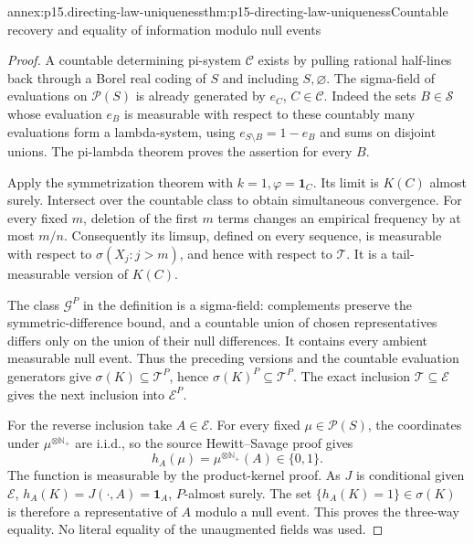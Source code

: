 \begin{annexitem}{annex:p15.directing-law-uniqueness}{thm:p15-directing-law-uniqueness}{Countable recovery and equality of information modulo null events}
\begin{proof}
A countable determining pi-system \(\mathcal C\) exists by pulling
rational half-lines back through a Borel real coding of \(S\) and
including \(S,\varnothing\).
The sigma-field of evaluations on \(\mathscr P(S)\) is already
generated by \(e_C\), \(C\in\mathcal C\).
Indeed the sets \(B\in\mathcal S\) whose evaluation \(e_B\) is measurable
with respect to these countably many evaluations form a lambda-system,
using \(e_{S\setminus B}=1-e_B\) and sums on disjoint unions.
The pi-lambda theorem proves the assertion for every \(B\).

Apply the symmetrization theorem with \(k=1,\varphi=\mathbf1_C\).
Its limit is \(K(C)\) almost surely. Intersect over the countable
class to obtain simultaneous convergence.
For every fixed \(m\), deletion of the first \(m\) terms changes an
empirical frequency by at most \(m/n\).
Consequently its limsup, defined on every sequence, is measurable with
respect to \(\sigma(X_j:j>m)\), and hence with respect to \(\mathcal T\).
It is a tail-measurable version of \(K(C)\).

The class \(\mathcal G^P\) in the definition is a sigma-field:
complements preserve the symmetric-difference bound, and a countable
union of chosen representatives differs only on the union of their
null differences. It contains every ambient measurable null event.
Thus the preceding versions and the countable evaluation generators
give \(\sigma(K)\subseteq\mathcal T^P\), hence
\(\sigma(K)^P\subseteq\mathcal T^P\).
The exact inclusion \(\mathcal T\subseteq\mathcal E\) gives the next
inclusion into \(\mathcal E^P\).

For the reverse inclusion take \(A\in\mathcal E\).
For every fixed \(\mu\in\mathscr P(S)\), the coordinates under
\(\mu^{\otimes\mathbb N_+}\) are i.i.d., so the source Hewitt--Savage
proof gives
\[
                            h_A(\mu)=\mu^{\otimes\mathbb N_+}(A)
                                                   \in\{0,1\}.
\]
The function is measurable by the product-kernel proof.
As \(J\) is conditional given \(\mathcal E\),
\(h_A(K)=J(\cdot,A)=\mathbf1_A\), \(P\)-almost surely.
The set \(\{h_A(K)=1\}\in\sigma(K)\) is therefore a representative
of \(A\) modulo a null event. This proves the three-way equality.
No literal equality of the unaugmented fields was used.


\end{proof}
\end{annexitem}
